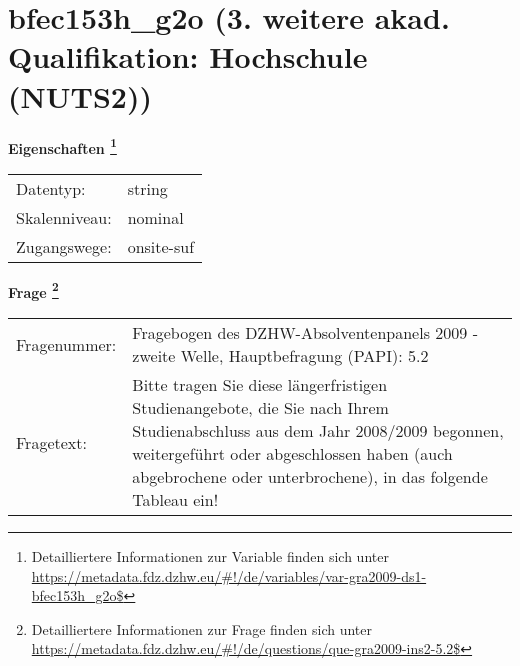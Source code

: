 
    \setcounter{footnote}{0}

    \vspace*{-1.8cm}
	\section{bfec153h\_g2o (3. weitere akad. Qualifikation: Hochschule (NUTS2))}
	\label{section:bfec153h_g2o}



    \vspace*{0.5cm}
    \noindent\textbf{Eigenschaften
	\footnote{Detailliertere Informationen zur Variable finden sich unter
		\url{https://metadata.fdz.dzhw.eu/\#!/de/variables/var-gra2009-ds1-bfec153h_g2o$}}}\\
	\begin{tabularx}{\hsize}{@{}lX}
	Datentyp: & string \\
	Skalenniveau: & nominal \\
	Zugangswege: &
	  onsite-suf
 \\
    \end{tabularx}



				\vspace*{0.5cm}
                \noindent\textbf{Frage
	                \footnote{Detailliertere Informationen zur Frage finden sich unter
		              \url{https://metadata.fdz.dzhw.eu/\#!/de/questions/que-gra2009-ins2-5.2$}}}\\
				\begin{tabularx}{\hsize}{@{}lX}
					Fragenummer: &
					  Fragebogen des DZHW-Absolventenpanels 2009 - zweite Welle, Hauptbefragung (PAPI):
					  5.2
 \\
					Fragetext: & Bitte tragen Sie diese längerfristigen Studienangebote, die Sie nach Ihrem Studienabschluss aus dem Jahr 2008/2009 begonnen, weitergeführt oder abgeschlossen haben (auch abgebrochene oder unterbrochene), in das folgende Tableau ein! \\
				\end{tabularx}





